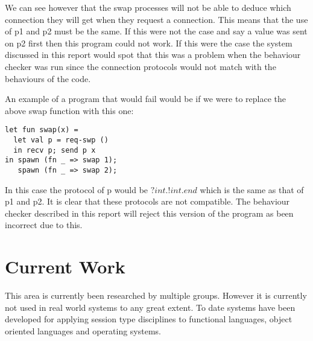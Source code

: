 We can see however that the swap processes will not be able to deduce which connection they will get when they request a connection. This means that the use of p1 and p2 must be the same. If this were not the case and say a value was sent on p2 first then this program could not work. If this were the case the system discussed in this report would spot that this was a problem when the behaviour checker was run since the connection protocols would not match with the behaviours of the code. 

An example of a program that would fail would be if we were to replace the above swap function with this one:

\begin{lstlisting}
let fun swap(x) =
  let val p = req-swp ()
  in recv p; send p x 
in spawn (fn _ => swap 1);
   spawn (fn _ => swap 2);
\end{lstlisting}

In this case the protocol of p would be $?int.!int.end$ which is the same as that of p1 and p2. It is clear that these protocols are not compatible. The behaviour checker described in this report will reject this version of the program as been incorrect due to this. 


\section{Current Work}
This area is currently been researched by multiple groups. However it is currently not used in real world systems to any great extent. To date systems have been developed for applying session type disciplines to functional languages, object oriented languages and operating systems. 

